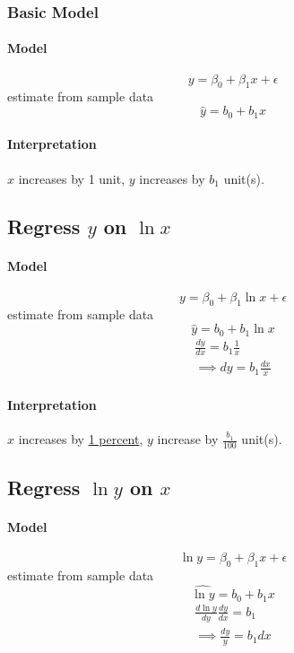 \documentclass{article}
\begin{document}
            \subsubsection{Basic Model}
	            \paragraph{Model}
	            \[
	                y = \beta_0 + \beta_1 x + \epsilon
	            \]
	            estimate from sample data
	            \[
	                \hat{y} = b_0 + b_1 x
	            \]
	            \paragraph{Interpretation} $x$ increases by 1 unit, $y$ increases by $b_1$ unit(s).
	       \subsection{Regress $y$ on $\ln{x}$}
	            \paragraph{Model}
	            \[
	                y = \beta_0 + \beta_1 \ln{x} + \epsilon
	            \]
	            estimate from sample data
	            \[
	               \hat{y} = b_0 + b_1 \ln{x}
	            \]
	            \begin{gather*}
	                \frac{dy}{dx} = b_1 \frac{1}{x} \\
	                \implies dy = b_1 \frac{dx}{x}
	            \end{gather*}
	            \paragraph{Interpretation} $x$ increases by \underline{1 percent}, $y$ increase by $\frac{b_1}{100}$ unit(s).
	            
	       \subsection{Regress $\ln{y}$ on $x$}
	            \paragraph{Model}
	            \[
	                \ln{y} = \beta_0 + \beta_1 x + \epsilon
	            \]
	            estimate from sample data
	            \[
	                \hat{\ln{y}} = b_0 + b_1 x
	            \]
	            \begin{gather*}
	                \frac{d\ln{y}}{dy} \frac{dy}{dx} = b_1 \\
	                \implies \frac{dy}{y} = b_1 dx 
	            \end{gather*}
\end{document}
